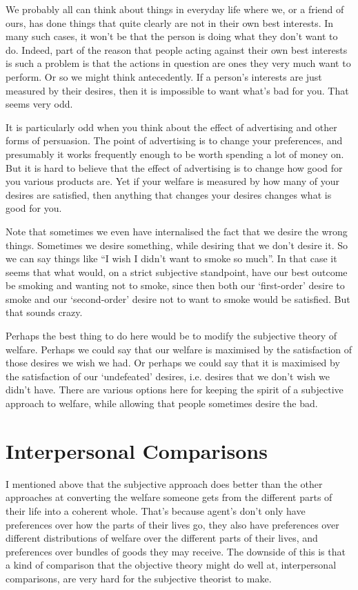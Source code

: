 We probably all can think about things in everyday life where we, or a friend of ours, has done things that quite clearly are not in their own best interests. In many such cases, it won't be that the person is doing what they don't want to do. Indeed, part of the reason that people acting against their own best interests is such a problem is that the actions in question are ones they very much want to perform. Or so we might think antecedently. If a person's interests are just measured by their desires, then it is impossible to want what's bad for you. That seems very odd.

It is particularly odd when you think about the effect of advertising and other forms of persuasion. The point of advertising is to change your preferences, and presumably it works frequently enough to be worth spending a lot of money on. But it is hard to believe that the effect of advertising is to change how good for you various products are. Yet if your welfare is measured by how many of your desires are satisfied, then anything that changes your desires changes what is good for you.

Note that sometimes we even have internalised the fact that we desire the wrong things. Sometimes we desire something, while desiring that we don't desire it. So we can say things like ``I wish I didn't want to smoke so much''. In that case it seems that what would, on a strict subjective standpoint, have our best outcome be smoking and wanting not to smoke, since then both our `first-order' desire to smoke and our `second-order' desire not to want to smoke would be satisfied. But that sounds crazy.

Perhaps the best thing to do here would be to modify the subjective theory of welfare. Perhaps we could say that our welfare is maximised by the satisfaction of those desires we wish we had. Or perhaps we could say that it is maximised by the satisfaction of our `undefeated' desires, i.e. desires that we don't wish we didn't have. There are various options here for keeping the spirit of a subjective approach to welfare, while allowing that people sometimes desire the bad.

\section{Interpersonal Comparisons}
I mentioned above that the subjective approach does better than the other approaches at converting the welfare someone gets from the different parts of their life into a coherent whole. That's because agent's don't only have preferences over how the parts of their lives go, they also have preferences over different distributions of welfare over the different parts of their lives, and preferences over bundles of goods they may receive. The downside of this is that a kind of comparison that the objective theory might do well at, interpersonal comparisons, are very hard for the subjective theorist to make.

